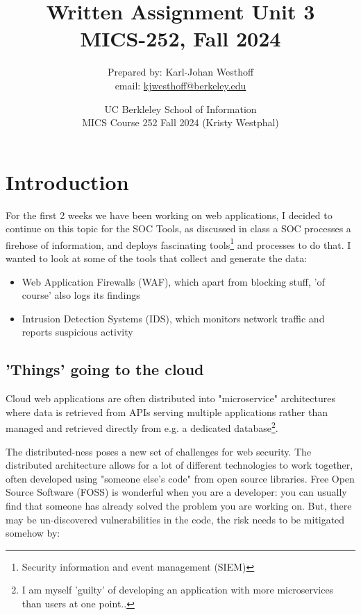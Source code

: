 \documentclass[
	letterpaper, %
	10pt, %
	unnumberedsections, %
	twoside, %
]{APAAssignment}
\title{Written Assignment Unit 3 \\ MICS-252, Fall 2024} %
\date{UC Berkleley School of Information \\
MICS Course 252 Fall 2024 (Kristy Westphal)
}
\author{
	Prepared by: Karl-Johan Westhoff \\
	email: \href{mailto:kjwesthoff@berkeley.edu}{kjwesthoff@berkeley.edu}
}
\begin{document}
\onecolumn
\maketitle %


\section{Introduction}
For the first 2 weeks we have been working on web applications, I decided to continue on this topic for the SOC Tools, as discussed in class a SOC processes a firehose of information, and deploys fascinating tools\footnote{Security information and event management (SIEM)} and processes to do that. I wanted to look at some of the tools that collect and generate the data:

\begin{itemize}
	\item Web Application Firewalls (WAF), which apart from blocking stuff, 'of course' also logs its findings
	\item Intrusion Detection Systems (IDS), which monitors network traffic and reports suspicious activity 
\end{itemize}

\subsection{'Things' going to the cloud}
Cloud web applications are often distributed into "microservice" architectures where data is retrieved from APIs serving multiple applications rather than managed and retrieved directly from e.g. a dedicated database\footnote{I am myself 'guilty' of developing an application with more microservices than users at one point..}. 

The distributed-ness poses a new set of challenges for web security. The distributed architecture allows for a lot of different technologies to work together, often developed using "someone else's code" from open source libraries. Free Open Source Software (FOSS) is wonderful when you are a developer: you can usually find that someone has already solved the problem you are working on. But, there may be un-discovered vulnerabilities in the code, the risk needs to be mitigated somehow by:
\end{document}
